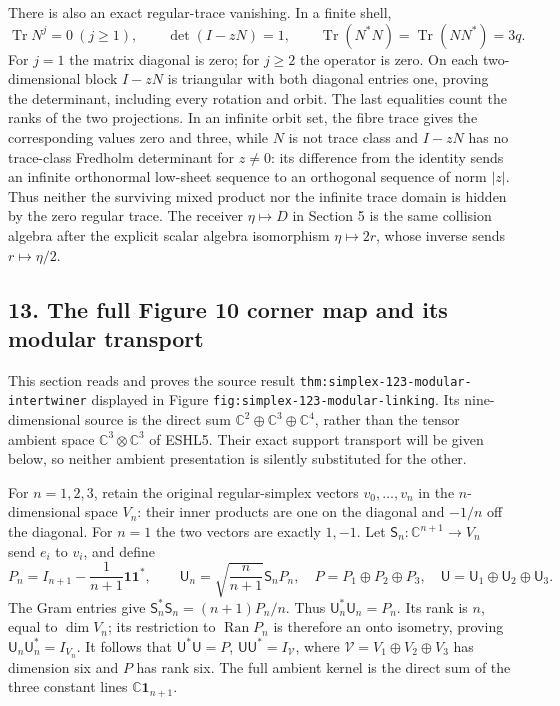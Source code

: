 \documentclass[
  10pt,
  a4paper,
]{article}
\begin{document}
There is also an exact regular-trace vanishing. In a finite shell, \[
\operatorname{Tr}N^j=0\ (j\ge1),\qquad
\det(I-zN)=1,\qquad
\operatorname{Tr}(N^*N)=\operatorname{Tr}(NN^*)=3q.
\tag{ESHL53}
\] For \(j=1\) the matrix diagonal is zero; for \(j\ge2\) the operator
is zero. On each two-dimensional block \(I-zN\) is triangular with both
diagonal entries one, proving the determinant, including every rotation
and orbit. The last equalities count the ranks of the two projections.
In an infinite orbit set, the fibre trace gives the corresponding values
zero and three, while \(N\) is not trace class and \(I-zN\) has no
trace-class Fredholm determinant for \(z\ne0\): its difference from the
identity sends an infinite orthonormal low-sheet sequence to an
orthogonal sequence of norm \(|z|\). Thus neither the surviving mixed
product nor the infinite trace domain is hidden by the zero regular
trace. The receiver \(\eta\mapsto D\) in Section 5 is the same collision
algebra after the explicit scalar algebra isomorphism \(\eta\mapsto2r\),
whose inverse sends \(r\mapsto\eta/2\).

\subsection{13. The full Figure 10 corner map and its modular
transport}\label{the-full-figure-10-corner-map-and-its-modular-transport}

This section reads and proves the source result
\texttt{thm:\allowbreak{}simplex-\allowbreak{}123-\allowbreak{}modular-\allowbreak{}intertwiner} displayed in Figure
\texttt{fig:\allowbreak{}simplex-\allowbreak{}123-\allowbreak{}modular-\allowbreak{}linking}. Its nine-dimensional source is
the direct sum \(\mathbb C^2\oplus\mathbb C^3\oplus\mathbb C^4\), rather
than the tensor ambient space \(\mathbb C^3\otimes\mathbb C^3\) of
ESHL5. Their exact support transport will be given below, so neither
ambient presentation is silently substituted for the other.

For \(n=1,2,3\), retain the original regular-simplex vectors
\(v_0,\ldots,v_n\) in the \(n\)-dimensional space \(V_n\): their inner
products are one on the diagonal and \(-1/n\) off the diagonal. For
\(n=1\) the two vectors are exactly \(1,-1\). Let
\(\mathsf S_n:\mathbb C^{n+1}\to V_n\) send \(e_i\) to \(v_i\), and
define \[
P_n=I_{n+1}-\frac1{n+1}\mathbf1\mathbf1^*,\qquad
\mathsf U_n=\sqrt{\frac n{n+1}}\mathsf S_nP_n,
\quad
P=P_1\oplus P_2\oplus P_3,
\quad\mathsf U=\mathsf U_1\oplus\mathsf U_2\oplus\mathsf U_3.
\tag{ESHL54}
\] The Gram entries give \(\mathsf S_n^*\mathsf S_n=(n+1)P_n/n\). Thus
\(\mathsf U_n^*\mathsf U_n=P_n\). Its rank is \(n\), equal to
\(\dim V_n\); its restriction to \(\operatorname{Ran}P_n\) is therefore
an onto isometry, proving \(\mathsf U_n\mathsf U_n^*=I_{V_n}\). It
follows that \(\mathsf U^*\mathsf U=P\),
\(\mathsf U\mathsf U^*=I_{\mathcal V}\), where
\(\mathcal V=V_1\oplus V_2\oplus V_3\) has dimension six and \(P\) has
rank six. The full ambient kernel is the direct sum of the three
constant lines \(\mathbb C\mathbf1_{n+1}\).
\end{document}
